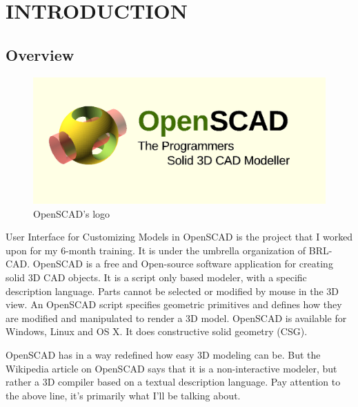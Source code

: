 \documentclass[12pt]{report}
\begin{document}
	
	\begin{screen}
		\ppttitle
	\end{screen}
\thispagestyle{empty} 
\pagetitle
\newpage
{}
\cfoot{\thepage}


\newpage


\tableofcontents
\listoffigures
{}
\cfoot{\thepage}

\chapter{INTRODUCTION}
\section{Overview}
\begin{figure}[H] 
	\centering \includegraphics[scale=0.31]{images/openscad.png}
	\caption{OpenSCAD's logo}
	\label{fig:openscadlogo}
\end{figure}

User Interface for Customizing Models in OpenSCAD is the project that I worked upon for my 6-month training. It is under the umbrella organization of BRL-CAD. OpenSCAD is a free and Open-source software application for creating solid 3D CAD objects. It is a script only based modeler, with a specific description language. Parts cannot be selected or modified by mouse in the 3D view. An OpenSCAD script specifies geometric primitives and defines how they are modified and manipulated to render a 3D model. OpenSCAD is available for Windows, Linux and OS X. It does constructive solid geometry (CSG).

OpenSCAD has in a way redefined how easy 3D modeling can be. But the Wikipedia article on OpenSCAD says that it is a non-interactive modeler, but rather a 3D compiler based on a textual description language. Pay attention to the above line, it’s primarily what I’ll be talking about.
\end{document}
